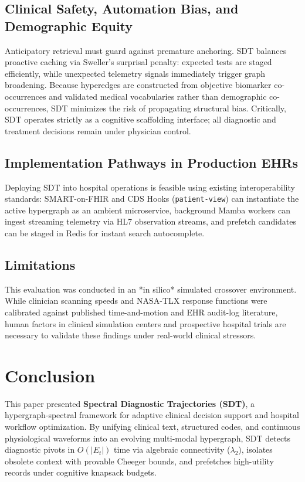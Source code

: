 \documentclass[12pt]{article}
\begin{document}
\subsection*{Clinical Safety, Automation Bias, and Demographic Equity}
Anticipatory retrieval must guard against premature anchoring. SDT balances proactive caching via Sweller's surprisal penalty: expected tests are staged efficiently, while unexpected telemetry signals immediately trigger graph broadening. Because hyperedges are constructed from objective biomarker co-occurrences and validated medical vocabularies rather than demographic co-occurrences, SDT minimizes the risk of propagating structural bias. Critically, SDT operates strictly as a cognitive scaffolding interface; all diagnostic and treatment decisions remain under physician control.

\subsection*{Implementation Pathways in Production EHRs}
Deploying SDT into hospital operations is feasible using existing interoperability standards: SMART-on-FHIR and CDS Hooks (\texttt{patient-view}) can instantiate the active hypergraph as an ambient microservice, background Mamba workers can ingest streaming telemetry via HL7 observation streams, and prefetch candidates can be staged in Redis for instant search autocomplete.

\subsection*{Limitations}
This evaluation was conducted in an *in silico* simulated crossover environment. While clinician scanning speeds and NASA-TLX response functions were calibrated against published time-and-motion and EHR audit-log literature, human factors in clinical simulation centers and prospective hospital trials are necessary to validate these findings under real-world clinical stressors.

\section*{Conclusion}

This paper presented \textbf{Spectral Diagnostic Trajectories (SDT)}, a hypergraph-spectral framework for adaptive clinical decision support and hospital workflow optimization. By unifying clinical text, structured codes, and continuous physiological waveforms into an evolving multi-modal hypergraph, SDT detects diagnostic pivots in $O(|E_t|)$ time via algebraic connectivity ($\lambda_2$), isolates obsolete context with provable Cheeger bounds, and prefetches high-utility records under cognitive knapsack budgets.
\end{document}
